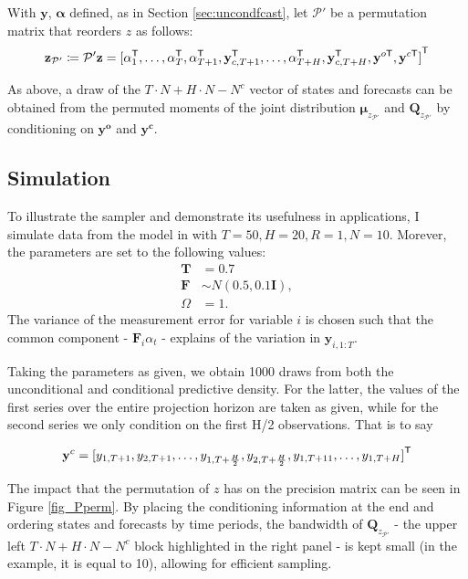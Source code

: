 \documentclass[notitlepage,a4paper,12pt]{article}
\newcommand{\transpose}[1]{{#1}^{\sf{T}}}
\begin{document}
With $\mathbf{y}$, $\boldsymbol{\alpha}$ defined, as in Section \ref{sec:uncondfcast}, let $\mathcal{P}'$ be a permutation matrix that reorders $z$ as follows:
$$
\mathbf{z}_{\mathcal{P}'} \coloneqq \mathcal{P}' \mathbf{z} =
 \transpose{[
     \alpha^{\sf{T}}_1, 
     \dots, 
     \alpha^{\sf{T}}_T, 
     \alpha^{\sf{T}}_{T+1}, 
     \mathbf{y}^{\sf{T}}_{c,T+1}, 
     \dots, 
     \alpha^{\sf{T}}_{T+H}, 
     \mathbf{y}^{\sf{T}}_{c,T+H},
     \mathbf{y}^{o\sf{T}},
     \mathbf{y}^{c\sf{T}}]}
$$

As above, a draw of the $T\!\cdot\!N + H\!\cdot\!N - N^c$ vector of states and forecasts can be obtained from the permuted moments of the joint distribution $\boldsymbol{\mu}_{z_{\mathcal{P}'}} $ and $\mathbf{Q}_{z_{\mathcal{P}'}} $ by conditioning on $\mathbf{y^{o}}$ and $\mathbf{y^c}$. 

\subsection{Simulation}

To illustrate the sampler and demonstrate its usefulness in applications, I simulate data from the model in with $T=50, H=20, R = 1, N=10$. Morever, the parameters are set to the following values: 
\begin{align*}
\mathbf{T} &= 0.7 \\
\mathbf{F} &\sim N(0.5, 0.1 \mathbf{I}), \\
\Omega &= 1.
\end{align*}
The variance of the measurement error for variable $i$ is chosen such that the common component - $\mathbf{F}_i \alpha_t$ - explains  of the variation in $\mathbf{y}_{i,1:T}$. 

Taking the parameters as given, we obtain 1000 draws from both the unconditional and conditional predictive density. For the latter, the values of the first series over the entire projection horizon are taken as given, while for the second series we only condition on the first H/2 observations. That is to say 

$$\mathbf{y}^c = \transpose{[y_{1,T+1}, y_{2,T+1}, \dots, y_{1,T+\frac{H}{2}}, y_{2,T+\frac{H}{2}}, y_{1,T+11}, \dots, y_{1,T+H}]}
$$

The impact that the permutation of $z$ has on the precision matrix can be seen in Figure \ref{fig_Pperm}. By placing the conditioning information at the end and ordering states and forecasts by time periods, the bandwidth of $\mathbf{Q}_{z_{\mathcal{P}'}}$ - the upper left $T\!\cdot\!N + H\!\cdot\!N - N^c$ block highlighted in the right panel - is kept small (in the example, it is equal to 10), allowing for efficient sampling. 
\end{document}
